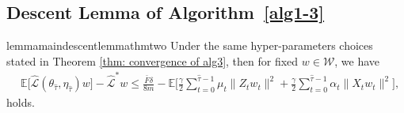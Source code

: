 \documentclass[twoside]{article} %
\theoremstyle{plain}
\theoremstyle{definition}
\theoremstyle{remark}
\newcommand{\htau}{\hat{\tau}}
\newcommand{\fhL}{\hat{\mathcal{L}}}
\begin{document}
\subsection{Descent Lemma of Algorithm~\ref{alg1-3}}\label{Appendix: Descent Lemma of Algorithm 1-3}

\begin{restatable}{lemma}{maindescentlemmathmtwo}\label{lemma: descent lemma of alg1-3}
Under the same hyper-parameters choices stated in Theorem \ref{thm: convergence of alg3}, then for fixed $w\in \mathcal{W}$, we have
    \begin{align}
        &\mathbb{E}\big[\fhL(\theta_{\htau}, \eta_{\htau})w\big]-\fhL^*w \leq \frac{\bar{F}\delta}{8m}-\mathbb{E}\Big[\frac{\gamma}{2}\sum_{t=0}^{\htau-1}\mu_t\|Z_tw_t\|^2+\frac{\gamma}{2}\sum_{t=0}^{\htau-1}\alpha_t\|X_tw_t\|^2 \Big],
        \label{eq: descent lemma alg1-3}
    \end{align}
holds.
\end{restatable}
\end{document}
